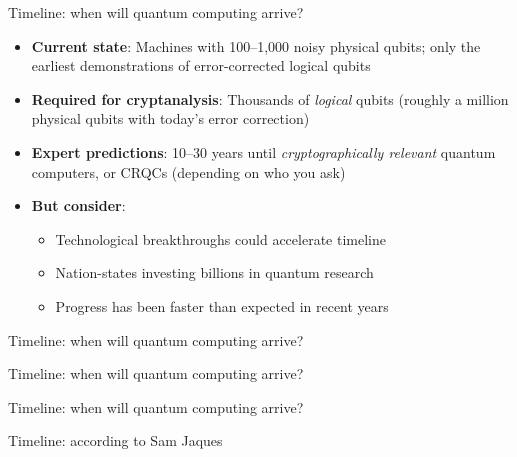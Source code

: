 \ifdefined\PRESENTATION\else\PassOptionsToClass{handout}{beamer}\fi\documentclass[aspectratio=169, lualatex]{beamer}
\begin{document}
\begin{frame}{Timeline: when will quantum computing arrive?}
	\begin{itemize}
		\item \textbf{Current state}: Machines with 100--1,000 noisy physical qubits; only the earliest demonstrations of error-corrected logical qubits
		\item \textbf{Required for cryptanalysis}: Thousands of \textit{logical} qubits (roughly a million physical qubits with today's error correction)
		\item \textbf{Expert predictions}: 10--30 years until \textit{cryptographically relevant} quantum computers, or CRQCs (depending on who you ask)
		\item \textbf{But consider}:
		      \begin{itemize}
			      \item Technological breakthroughs could accelerate timeline
			      \item Nation-states investing billions in quantum research
			      \item Progress has been faster than expected in recent years
		      \end{itemize}
	\end{itemize}
\end{frame}

\begin{frame}{Timeline: when will quantum computing arrive?}
\end{frame}

\begin{frame}{Timeline: when will quantum computing arrive?}
\end{frame}

\begin{frame}{Timeline: when will quantum computing arrive?}
\end{frame}

\begin{frame}{Timeline: according to Sam Jaques}
\end{frame}
\end{document}

